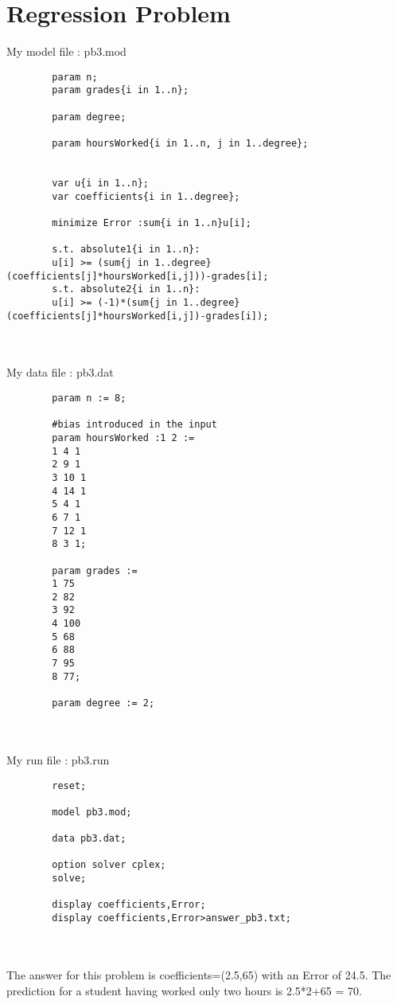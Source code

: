 \documentclass{article}
\newenvironment{DDbox}[1]{
\begin{lrbox}{\BBbox}
    \begin{minipage}{\linewidth}}
{\end{minipage}
\end{lrbox}\noindent\colorbox{Zgris}{\usebox{\BBbox}} \\
[.5cm]}
\begin{document}
\section*{Regression Problem}
My model file : pb3.mod
\\
\begin{DDbox}{\linewidth}
    \begin{verbatim}
        param n;
        param grades{i in 1..n};

        param degree;

        param hoursWorked{i in 1..n, j in 1..degree};


        var u{i in 1..n};
        var coefficients{i in 1..degree};

        minimize Error :sum{i in 1..n}u[i];

        s.t. absolute1{i in 1..n}: 
        u[i] >= (sum{j in 1..degree}(coefficients[j]*hoursWorked[i,j]))-grades[i];
        s.t. absolute2{i in 1..n}: 
        u[i] >= (-1)*(sum{j in 1..degree}(coefficients[j]*hoursWorked[i,j])-grades[i]);
    \end{verbatim}
\end{DDbox}
\\
My data file : pb3.dat
\\
\begin{DDbox}{\linewidth}
    \begin{verbatim}
        param n := 8;

        #bias introduced in the input
        param hoursWorked :1 2 := 
        1 4 1
        2 9 1
        3 10 1
        4 14 1
        5 4 1
        6 7 1
        7 12 1
        8 3 1;

        param grades := 
        1 75
        2 82
        3 92
        4 100
        5 68
        6 88
        7 95
        8 77;

        param degree := 2;

    \end{verbatim}
\end{DDbox}
\\
\newpage
My run file : pb3.run
\\
\begin{DDbox}{\linewidth}
    \begin{verbatim}
        reset;

        model pb3.mod;

        data pb3.dat;

        option solver cplex;
        solve;

        display coefficients,Error;
        display coefficients,Error>answer_pb3.txt;
    \end{verbatim}
\end{DDbox}
\\
The answer for this problem is coefficients=(2.5,65) with an Error of 24.5.
The prediction for a student having worked only two hours is 2.5*2+65 = 70.
\end{document}
